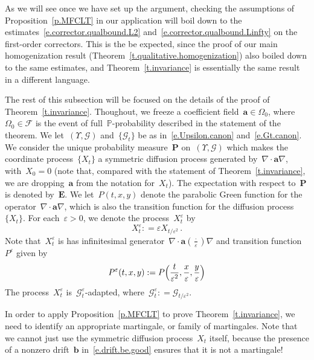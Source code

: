 \documentclass[11pt]{article} %
\numberwithin{equation}{section}
\theoremstyle{definition}
\newcommand{\eps}{\varepsilon}
\renewcommand{\b}{\ensuremath{\mathbf{b}}}
\newcommand{\ep}{\eps}
\renewcommand{\a}{\mathbf{a}}
\newcommand{\F}{\mathcal{F}}
\renewcommand{\P}{\mathbb{P}}
\begin{document}
\smallskip

As we will see once we have set up the argument, checking the assumptions of Proposition~\ref{p.MFCLT} in our application will boil down to the estimates~\eqref{e.corrector.qualbound.L2} and~\eqref{e.corrector.qualbound.Linfty} on the first-order correctors.  This is the be expected, since the proof of our main homogenization result (Theorem~\ref{t.qualitative.homogenization}) also boiled down to the same estimates, and Theorem~\ref{t.invariance} is essentially the same result in a different language. 

\smallskip

The rest of this subsection will be focused on the details of the proof of Theorem~\ref{t.invariance}. Thoughout, we freeze a coefficient field~$\a \in \Omega_0$, where~$\Omega_0 \in\F$ is the event of full~$\P$-probability described in the statement of the theorem. 
We let~$(\Upsilon,\mathcal{G})$  and~$\{ \mathcal{G}_t \}$ be as in~\eqref{e.Upsilon.canon} and~\eqref{e.Gt.canon}.
We consider the unique probability measure~$\mathbf{P}$ on~$(\Upsilon,\mathcal{G})$ which makes the coordinate process~$\{ X_t\}$ a symmetric diffusion process generated by~$\nabla \cdot \a\nabla$, with~$X_0=0$ (note that, compared with the statement of Theorem~\ref{t.invariance}, we are dropping~$\a$ from the notation for~$X_t$). The expectation with respect to~$\mathbf{P}$ is denoted by~$\mathbf{E}$.
We let~$P(t,x,y)$ denote the parabolic Green function for the operator~$\nabla \cdot \a\nabla$, which is also the transition function for the diffusion process~$\{ X_t\}$.
For each~$\ep>0$, we denote the process~$X_t^\ep$ by
\begin{equation*}
X_t^\ep : = \ep  X_{  t/{\ep^2} }\,.
\end{equation*}
Note that~$X_t^\ep$ is has infinitesimal generator~$\nabla \cdot \a(\frac\cdot\ep)\nabla$ and transition function~$P^\ep$ given by
\begin{equation}
\label{e.Pep}
P^\ep(t,x,y) 
:=
P \Bigl ( \frac{t}{ \ep^2} ,  \frac{ x} { \ep} ,  \frac{y} {\ep} \Bigr)
\end{equation}
The process~$X_t^\ep$ is~$\mathcal{G}_{t}^\ep$-adapted, where~$\mathcal{G}_{t}^\ep: = \mathcal{G}_{t/\ep^2}$. 

\smallskip


\smallskip

In order to apply Proposition~\ref{p.MFCLT} to prove Theorem~\ref{t.invariance}, we need to identify an appropriate martingale, or family of martingales.
Note that we cannot just use the symmetric diffusion process~$X_t$ itself, because the presence of a nonzero drift~$\b$ in~\eqref{e.drift.be.good} ensures that it is not a martingale! 
\end{document}
